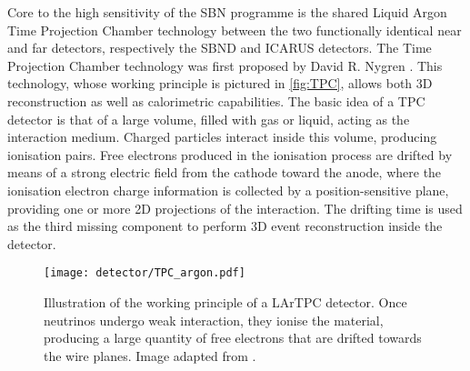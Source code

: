 Core to the high sensitivity of the SBN programme is the shared Liquid Argon Time Projection Chamber technology between the two functionally identical near and far detectors, respectively the SBND and ICARUS detectors. The Time Projection Chamber technology was first proposed by David R. Nygren \cite{Marx:1978zz}. This technology, whose working principle is pictured in \autoref{fig:TPC}, allows both 3D reconstruction as well as calorimetric capabilities. The basic idea of a TPC detector is that of a large volume, filled with gas or liquid, acting as the interaction medium. Charged particles interact inside this volume, producing ionisation pairs. Free electrons produced in the ionisation process are drifted by means of a strong electric field from the cathode toward the anode, where the ionisation electron charge information is collected by a position-sensitive plane, providing one or more 2D projections of the interaction. The drifting time is used as the third missing component to perform 3D event reconstruction inside the detector. 

\begin{figure}
    \centering
    \texttt{[image: detector/TPC\_argon.pdf]}
    \caption[LArTPC illustration]{Illustration of the working principle of a LArTPC detector. Once neutrinos undergo weak interaction, they ionise the material, producing a large quantity of free electrons that are drifted towards the wire planes. Image adapted from \cite{triozziStudyTriggerSystem}. }
    \label{fig:TPC}
\end{figure}

